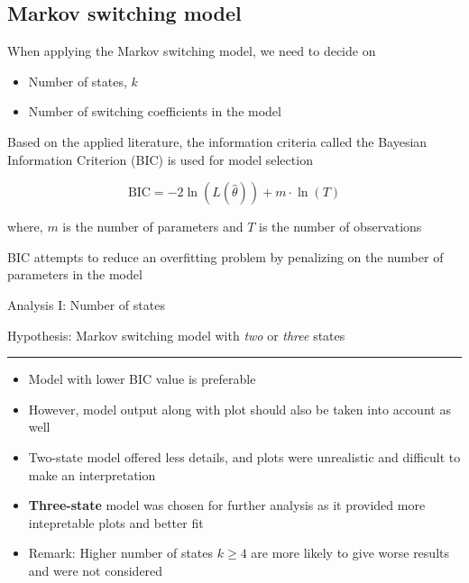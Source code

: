 \documentclass{beamer}
\begin{document}
\subsection{Markov switching model}
\begin{frame}
When applying the Markov switching model, we need to decide on
\begin{itemize}
	\item Number of states, $k$
	\item Number of switching coefficients in the model
\end{itemize}
\vspace{1em}

Based on the applied literature, the information criteria called the Bayesian Information Criterion (BIC) is used for model selection

$$\mathrm{BIC}=-2\ln(L(\hat{\theta}))+m\cdot\ln(T)$$

\footnotesize{where, $m$ is the number of parameters and $T$ is the number of observations}

\normalsize{BIC attempts to reduce an overfitting problem by penalizing on the number of parameters in the model}

\end{frame}

\begin{frame}

Analysis I: Number of states

Hypothesis: Markov switching model with \textit{two} or \textit{three} states
\rule{\textwidth}{0.4pt}

\begin{itemize}
	\item Model with lower BIC value is preferable
	\item However, model output along with plot should also be taken into account as well
	\pause
	\item Two-state model offered less details, and plots were unrealistic and difficult to make an interpretation
	\item \textbf{Three-state} model was chosen for further analysis as it provided more intepretable plots and better fit
	\item \small{Remark: Higher number of states $k\geq4$ are more likely to give worse results and were not considered}
\end{itemize}

\end{frame}
\end{document}
